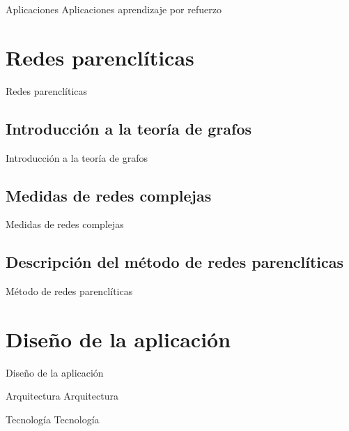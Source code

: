 \documentclass[hyperref={unicode}]{beamer}
\begin{document}
\begin{frame}{Aplicaciones}
	Aplicaciones aprendizaje por refuerzo
\end{frame}

\section{Redes parenclíticas}
\begin{frame}{Redes parenclíticas}
	
\end{frame}

\subsection{Introducción a la teoría de grafos}
\begin{frame}{Introducción a la teoría de grafos}
	
\end{frame}

\subsection{Medidas de redes complejas}
\begin{frame}{Medidas de redes complejas}
	
\end{frame}

\subsection{Descripción del método de redes parenclíticas}
\begin{frame}{Método de redes parenclíticas}
	
\end{frame}

\section{Diseño de la aplicación}
\begin{frame}{Diseño de la aplicación}
	
\end{frame}

\begin{frame}{Arquitectura}
	Arquitectura
\end{frame}

\begin{frame}{Tecnología}
	Tecnología
\end{frame}
\end{document}
